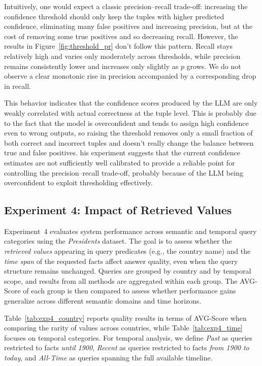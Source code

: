 \documentclass[11pt]{article}
\begin{document}
Intuitively, one would expect a classic precision–recall trade‑off: increasing the confidence threshold should only keep the tuples with higher predicted confidence, eliminating many false positives and increasing precision, but at the cost of removing some true positives and so decreasing recall. However, the results in Figure~\ref{fig:threshold_pr} don't follow this pattern. Recall stays relatively high and varies only moderately across thresholds, while precision remains consistently lower and increases only slightly as \(p\) grows. We do not observe a clear monotonic rise in precision accompanied by a corresponding drop in recall.

This behavior indicates that the confidence scores produced by the LLM are only weakly correlated with actual correctness at the tuple level. This is probably due to the fact that the model is overconfident and tends to assign high confidence even to wrong outputs, so raising the threshold removes only a small fraction of both correct and incorrect tuples and doesn't really change the balance between true and false positives. his experiment suggests that the current confidence estimates are not sufficiently well calibrated to provide a reliable point for controlling the precision–recall trade‑off, probably because of the LLM being overconfident to exploit thresholding effectively. 

\subsection{Experiment 4: Impact of Retrieved Values}

Experiment~4 evaluates system performance across semantic and temporal query categories using the \textit{Presidents} dataset.
The goal is to assess whether the \emph{retrieved values} appearing in query predicates (e.g., the country name) and the \emph{time span} of the requested facts affect answer quality, even when the query structure remains unchanged.
Queries are grouped by country and by temporal scope, and results from all methods are aggregated within each group.
The AVG-Score of each group is then compared to assess whether performance gains generalize across different semantic domains and time horizons.

Table~\ref{tab:exp4_country} reports quality results in terms of AVG-Score when comparing the rarity of values across countries, while Table~\ref{tab:exp4_time} focuses on temporal categories.
For temporal analysis, we define \textit{Past} as queries restricted to facts \emph{until 1900}, \textit{Recent} as queries restricted to facts \emph{from 1900 to today}, and \textit{All-Time} as queries spanning the full available timeline.
\end{document}
